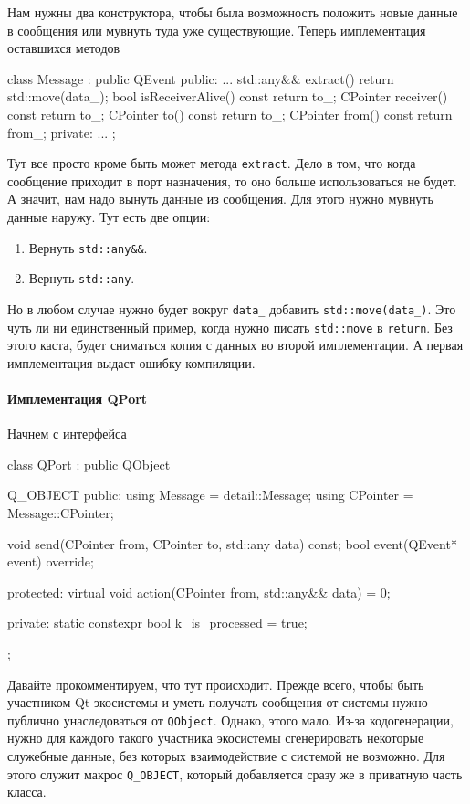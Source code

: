 Нам нужны два конструктора, чтобы была возможность положить новые данные в сообщения или мувнуть туда уже существующие.
Теперь имплементация оставшихся методов
\begin{cppcode}
class Message : public QEvent {
public:
  ...
  std::any&& extract() {
    return std::move(data_);
  }
  bool isReceiverAlive() const {
    return to_;
  }
  CPointer receiver() const {
    return to_;
  }
  CPointer to() const {
    return to_;
  }
  CPointer from() const {
    return from_;
  }
private:
  ...
};
\end{cppcode}
Тут все просто кроме быть может метода \verb"extract".
Дело в том, что когда сообщение приходит в порт назначения, то оно больше использоваться не будет.
А значит, нам надо вынуть данные из сообщения.
Для этого нужно мувнуть данные наружу.
Тут есть две опции:
\begin{enumerate}
\item Вернуть \verb"std::any&&".

\item Вернуть \verb"std::any".
\end{enumerate}
Но в любом случае нужно будет вокруг \verb"data_" добавить \verb"std::move(data_)".
Это чуть ли ни единственный пример, когда нужно писать \verb"std::move" в \verb"return".
Без этого каста, будет сниматься копия с данных во второй имплементации.
А первая имплементация выдаст ошибку компиляции.

\paragraph{Имплементация QPort}

Начнем с интерфейса
\begin{cppcode}
class QPort : public QObject {
  Q_OBJECT
public:
  using Message = detail::Message;
  using CPointer = Message::CPointer;

  void send(CPointer from, CPointer to, std::any data) const;
  bool event(QEvent* event) override;

protected:
  virtual void action(CPointer from, std::any&& data) = 0;

private:
  static constexpr bool k_is_processed = true;
};
\end{cppcode}
Давайте прокомментируем, что тут происходит.
Прежде всего, чтобы быть участником Qt экосистемы и уметь получать сообщения от системы нужно публично унаследоваться от \verb"QObject".
Однако, этого мало.
Из-за кодогенерации, нужно для каждого такого участника экосистемы сгенерировать некоторые служебные данные, без которых взаимодействие с системой не возможно.
Для этого служит макрос \verb"Q_OBJECT", который добавляется сразу же в приватную часть класса.

